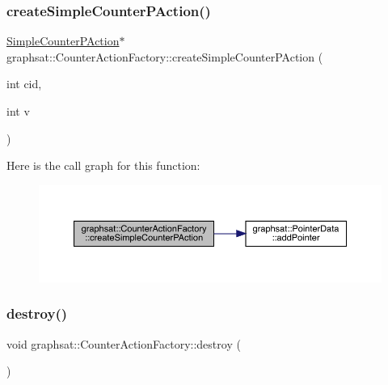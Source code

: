 \subsubsection{\texorpdfstring{createSimpleCounterPAction()}{createSimpleCounterPAction()}}
{\footnotesize\ttfamily \mbox{\hyperlink{classgraphsat_1_1_simple_counter_p_action}{Simple\+Counter\+P\+Action}}$\ast$ graphsat\+::\+Counter\+Action\+Factory\+::create\+Simple\+Counter\+P\+Action (\begin{DoxyParamCaption}\item[{int}]{cid,  }\item[{int}]{v }\end{DoxyParamCaption})\hspace{0.3cm}{\ttfamily [inline]}}

Here is the call graph for this function\+:\nopagebreak
\begin{figure}[H]
\begin{center}
\leavevmode
\includegraphics[width=350pt]{classgraphsat_1_1_counter_action_factory_a4bd75f27e6c64f7b2391504ccc506271_cgraph}
\end{center}
\end{figure}
\mbox{\label{classgraphsat_1_1_counter_action_factory_a0fc2717a2818daca93d780a71aea82c2}} 
\subsubsection{\texorpdfstring{destroy()}{destroy()}}
{\footnotesize\ttfamily void graphsat\+::\+Counter\+Action\+Factory\+::destroy (\begin{DoxyParamCaption}{ }\end{DoxyParamCaption})\hspace{0.3cm}{\ttfamily [inline]}}

